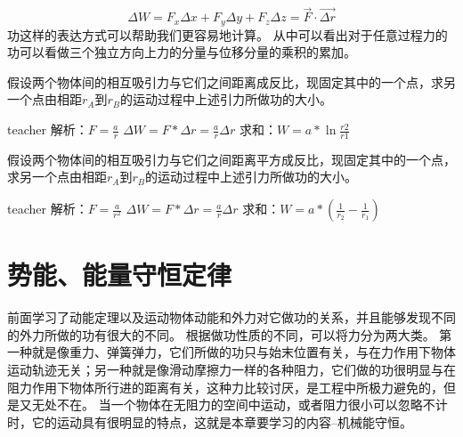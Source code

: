 \begin{equation}
\Delta W = F_x\Delta x +F_y\Delta y+F_z\Delta z = \vec{F}\cdot\vec{\Delta r}
\end{equation}
功这样的表达方式可以帮助我们更容易地计算。
从中可以看出对于任意过程力的功可以看做三个独立方向上力的分量与位移分量的乘积的累加。

\begin{example}
假设两个物体间的相互吸引力与它们之间距离成反比，现固定其中的一个点，求另一个点由相距$r_A$到$r_B$的运动过程中上述引力所做功的大小。
\begin{taggedblock}{teacher}
\newline
解析：$F=\frac{a}{r}$   $\Delta W=F*\Delta r=\frac{a}{r}\Delta r$ 求和：$W=a*\ln\frac{r2}{r1}$
\end{taggedblock}
\end{example}


\begin{example}
假设两个物体间的相互吸引力与它们之间距离平方成反比，现固定其中的一个点，求另一个点由相距$r_A$到$r_B$的运动过程中上述引力所做功的大小。
\begin{taggedblock}{teacher}
\newline
解析：$F=\frac{a}{r^2}$   $\Delta W=F*\Delta r=\frac{a}{r}\Delta r$ 求和：$W=a*(\frac{1}{r_2}-\frac{1}{r_1})$
\end{taggedblock}
\end{example}



\section{势能、能量守恒定律}
前面学习了动能定理以及运动物体动能和外力对它做功的关系，并且能够发现不同的外力所做的功有很大的不同。
根据做功性质的不同，可以将力分为两大类。
第一种就是像重力、弹簧弹力，它们所做的功只与始末位置有关，与在力作用下物体运动轨迹无关；另一种就是像滑动摩擦力一样的各种阻力，它们做的功很明显与在阻力作用下物体所行进的距离有关，这种力比较讨厌，是工程中所极力避免的，但是又无处不在。
当一个物体在无阻力的空间中运动，或者阻力很小可以忽略不计时，它的运动具有很明显的特点，这就是本章要学习的内容--机械能守恒。

